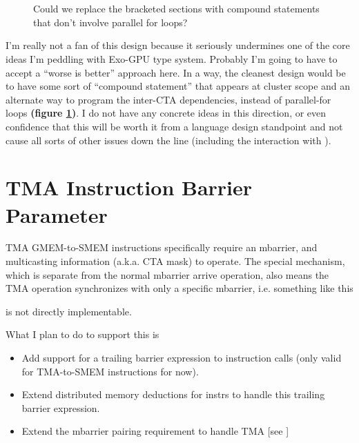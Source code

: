 \begin{figure}[!b]

\\
\\

\caption{Could we replace the bracketed sections with compound statements that don't involve parallel for loops?} \label{fig:multicast_loop_nest}
\end{figure}

\filbreak
{}

I'm really not a fan of this design because it seriously undermines one of the core ideas I'm peddling with Exo-GPU type system.
Probably I'm going to have to accept a ``worse is better'' approach here.
In a way, the cleanest design would be to have some sort of ``compound statement'' that appears at cluster scope and an alternate way to program the inter-CTA dependencies, instead of parallel-for loops \textbf{(figure \ref{fig:multicast_loop_nest})}.
I do not have any concrete ideas in this direction, or even confidence that this will be worth it from a language design standpoint and not cause all sorts of other issues down the line (including the interaction with ).

\newpage
\section{TMA Instruction Barrier Parameter}
\label{ch:tma}

TMA GMEM-to-SMEM instructions specifically require an mbarrier, and multicasting information (a.k.a. CTA mask) to operate.
The special  mechanism, which is separate from the normal mbarrier arrive operation, also means the TMA operation synchronizes with only a specific mbarrier, i.e. something like this



is not directly implementable.

\filbreak
What I plan to do to support this is
\begin{itemize}
  \item Add support for a trailing barrier expression  to instruction calls (only valid for TMA-to-SMEM instructions for now).
  \filbreak
  \item Extend distributed memory deductions for instrs to handle this trailing barrier expression.
  \filbreak
  \item Extend the mbarrier pairing requirement to handle TMA [see ]
\end{itemize}

